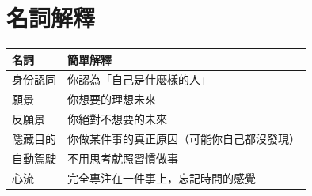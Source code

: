 \documentclass[12pt,a4paper]{article}
\begin{document}
\section{名詞解釋}

\begin{longtable}{p{4cm}p{10cm}}
\toprule
\textbf{名詞} & \textbf{簡單解釋} \\
\midrule
\endfirsthead

\bottomrule
\endfoot

身份認同 & 你認為「自己是什麼樣的人」 \\
\midrule
願景 & 你想要的理想未來 \\
\midrule
反願景 & 你絕對不想要的未來 \\
\midrule
隱藏目的 & 你做某件事的真正原因（可能你自己都沒發現） \\
\midrule
自動駕駛 & 不用思考就照習慣做事 \\
\midrule
心流 & 完全專注在一件事上，忘記時間的感覺 \\
\bottomrule
\end{longtable}
\end{document}
